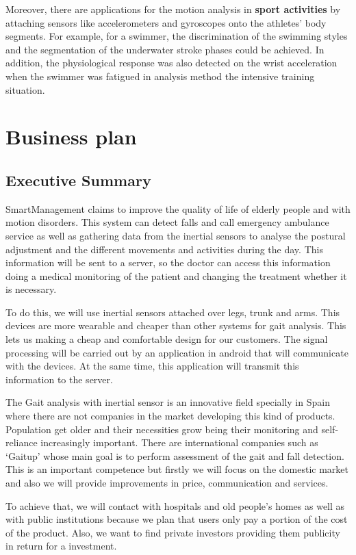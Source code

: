Moreover, there are applications for the motion analysis in \textbf{sport activities} by attaching sensors like accelerometers and gyroscopes onto the athletes' body segments. For example, for a swimmer, the discrimination of the swimming styles and the segmentation of the underwater stroke phases could be achieved. In addition, the physiological response was also detected on the wrist acceleration when the swimmer was fatigued in analysis method the intensive training situation\cite{Yuji}.


\section{Business plan }
\subsection{Executive Summary}
SmartManagement claims to improve  the quality of life of elderly  people and with motion disorders. This system can detect falls and call emergency ambulance service as well as gathering data from the inertial sensors to analyse the postural adjustment and the different movements and activities during the day. This information will be sent to a server, so the doctor can access this information  doing a medical monitoring of the patient and changing the treatment whether it is necessary.

To do this, we will use inertial sensors attached over legs, trunk and arms. This devices are more wearable and cheaper than other systems for gait analysis. This lets us making a cheap and comfortable design for our customers. The signal processing will be carried out by an application in android that will communicate with the devices. At the same time, this application will transmit this information to the server.

The Gait analysis with inertial sensor is an innovative field specially in Spain where there are not companies in the market developing this kind of products. Population get older and their necessities grow being their monitoring and self-reliance increasingly important.
There are international companies such as ‘Gaitup’ whose main goal is to perform assessment of the gait  and fall detection. This is an important competence but firstly we will focus on the domestic market and also we will provide improvements in price, communication and services.

To achieve that, we will contact with hospitals and old people’s homes as well as with public institutions because we plan that users only pay a portion of the cost of the product. Also, we want to find private investors providing them publicity in return for a investment.

